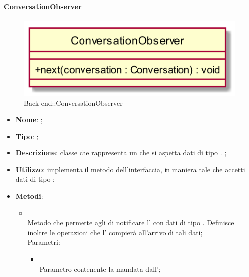 \hypertarget{ConversationObserver_label}{\paragraph{ConversationObserver}}
\begin{figure}[h]
	\centering
	\includegraphics[width=\textwidth,height=\textheight,keepaspectratio]{images/ClassConversationObserver.png}
	\caption{Back-end::ConversationObserver}
\end{figure}
\begin{itemize}
	\item \textbf{Nome}: ;
	\item \textbf{Tipo}: ;
	\item \textbf{Descrizione}: classe che rappresenta un  che si aspetta dati di tipo . ;
	\item \textbf{Utilizzo}: implementa il metodo  dell'interfaccia, in maniera tale che accetti dati di tipo ;
	\item \textbf{Metodi}:
	\begin{itemize}
		\item[]  \\
		Metodo che permette agli  di notificare l' con dati di tipo . Definisce inoltre le operazioni che l' compierà all'arrivo di tali dati;\\
		Parametri:
		\begin{itemize}
			\item {} \\
			Parametro contenente la  mandata dall';
		\end{itemize}
	\end{itemize}
\end{itemize}

